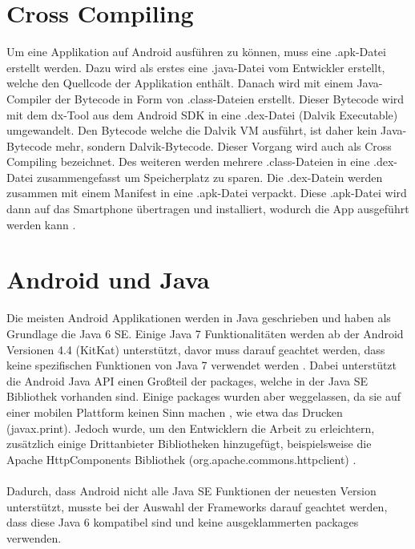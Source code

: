 \section{Cross Compiling}
Um eine Applikation auf Android ausführen zu können, muss eine .apk-Datei erstellt werden. Dazu wird als erstes eine .java-Datei vom Entwickler erstellt, welche den Quellcode der Applikation enthält. Danach wird mit einem Java-Compiler der Bytecode in Form von .class-Dateien erstellt. Dieser Bytecode wird mit dem dx-Tool aus dem Android SDK in eine .dex-Datei (Dalvik Executable) umgewandelt. Den Bytecode welche die Dalvik VM ausführt, ist daher kein Java-Bytecode mehr, sondern Dalvik-Bytecode. Dieser Vorgang wird auch als Cross Compiling bezeichnet. Des weiteren werden mehrere .class-Dateien in eine .dex-Datei zusammengefasst um Speicherplatz zu sparen. Die .dex-Datein werden zusammen mit einem Manifest in eine .apk-Datei verpackt. Diese .apk-Datei wird dann auf das Smartphone übertragen und installiert, wodurch die App ausgeführt werden kann \cite{unterschied:dirscherl}.	

\section{Android und Java}
Die meisten Android Applikationen werden in Java geschrieben und haben als Grundlage die Java 6 \acrfull{SE}. Einige Java 7 Funktionalitäten werden ab der Android Versionen 4.4 (KitKat) unterstützt, davor muss darauf geachtet werden, dass keine spezifischen Funktionen von Java 7 verwendet werden \cite{android:burnette}. Dabei unterstützt die Android Java \acrfull{API} einen Großteil der packages, welche in der Java SE Bibliothek vorhanden sind. Einige packages wurden aber weggelassen, da sie auf einer mobilen Plattform keinen Sinn machen \cite{implemenationSDK}, wie etwa das Drucken (javax.print). Jedoch wurde, um den Entwicklern die Arbeit zu erleichtern, zusätzlich einige Drittanbieter Bibliotheken hinzugefügt, beispielsweise die Apache HttpComponents Bibliothek (org.apache.commons.httpclient) \cite{android:libs}. 
\\\\	
Dadurch, dass Android nicht alle Java SE Funktionen der neuesten Version unterstützt, musste bei der Auswahl der Frameworks darauf geachtet werden, dass diese Java 6 kompatibel sind und keine ausgeklammerten packages verwenden.	

